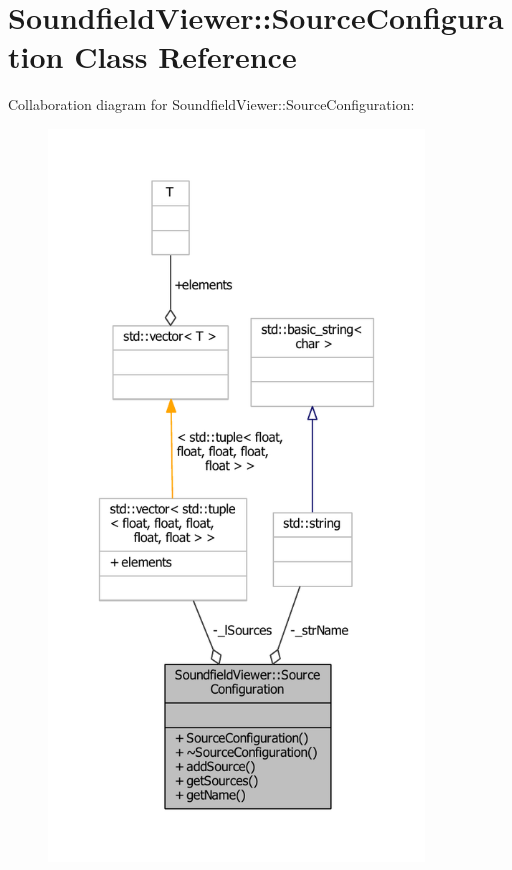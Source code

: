 \section{Soundfield\-Viewer\-:\-:Source\-Configuration Class Reference}
\label{classSoundfieldViewer_1_1SourceConfiguration}


Collaboration diagram for Soundfield\-Viewer\-:\-:Source\-Configuration\-:\nopagebreak
\begin{figure}[H]
\begin{center}
\leavevmode
\includegraphics[height=550pt]{d4/d7e/classSoundfieldViewer_1_1SourceConfiguration__coll__graph}
\end{center}
\end{figure}
